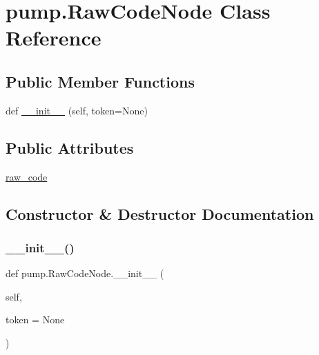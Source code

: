 \hypertarget{classpump_1_1_raw_code_node}{}\section{pump.\+Raw\+Code\+Node Class Reference}
\label{classpump_1_1_raw_code_node}
\subsection*{Public Member Functions}
\begin{DoxyCompactItemize}
\item 
def \hyperlink{classpump_1_1_raw_code_node_a7ba81f4da42d4e96a89713032867f87f}{\+\_\+\+\_\+init\+\_\+\+\_\+} (self, token=None)
\end{DoxyCompactItemize}
\subsection*{Public Attributes}
\begin{DoxyCompactItemize}
\item 
\hyperlink{classpump_1_1_raw_code_node_ab36224d959e0d8f803e9fac8e6a0baab}{raw\+\_\+code}
\end{DoxyCompactItemize}


\subsection{Constructor \& Destructor Documentation}
\mbox{\label{classpump_1_1_raw_code_node_a7ba81f4da42d4e96a89713032867f87f}} 
\subsubsection{\texorpdfstring{\+\_\+\+\_\+init\+\_\+\+\_\+()}{\_\_init\_\_()}}
{\footnotesize\ttfamily def pump.\+Raw\+Code\+Node.\+\_\+\+\_\+init\+\_\+\+\_\+ (\begin{DoxyParamCaption}\item[{}]{self,  }\item[{}]{token = {\ttfamily None} }\end{DoxyParamCaption})}



